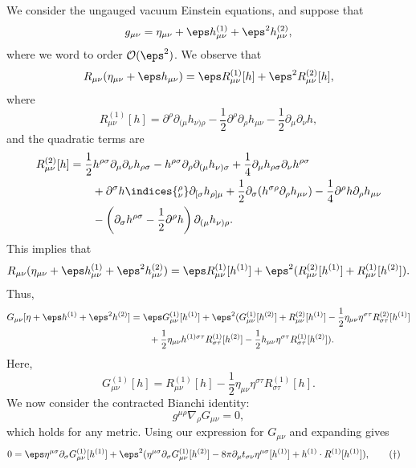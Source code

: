 \documentclass[12pt]{article}
\begin{document}
We consider the ungauged vacuum Einstein equations, and suppose that
\[
g_{\mu\nu} = \eta_{\mu\nu} + \eps h_{\mu\nu}^{(1)} + \eps^2 h_{\mu\nu}^{(2)},
\]
where we word to order $\mathcal{O}(\eps^2)$. We observe that
\[
	R_{\mu\nu}(\eta_{\mu\nu} + \eps h_{\mu\nu}) = \eps R_{\mu\nu}^{(1)}[h] + \eps^2 R_{\mu\nu}^{(2)}[h],
\]
where
\[
	R_{\mu\nu}^{(1)}[h] = \partial^\rho \partial_{(\mu} h_{\nu) \rho} - \frac 12 \partial^\rho \partial_\rho h_{\mu\nu} - \frac 12 \partial_\mu \partial_\nu h,
\]
and the quadratic terms are
\begin{align*}
	R_{\mu\nu}^{(2)}[h] &= \frac 12 h^{\rho\sigma}\partial_\mu \partial_\nu h_{\rho\sigma} - h^{\rho\sigma} \partial_\rho \partial_{(\mu} h_{\nu) \sigma} + \frac 14 \partial_\mu h_{\rho\sigma} \partial_\nu h^{\rho\sigma} \\
			    &\qquad + \partial^\sigma h\indices{^{\rho}_{\nu}} \partial_{[\sigma} h_{\rho]\mu} + \frac 12 \partial_\sigma (h^{\sigma\rho} \partial_\rho h_{\mu\nu} ) - \frac 14 \partial^\rho h \partial_\rho h_{\mu\nu} \\
			    & \qquad - \left(\partial_\sigma h^{\rho\sigma} - \frac 12 \partial^\rho h\right) \partial_{(\mu} h_{\nu)\rho}.
\end{align*}
This implies that
\[
	R_{\mu\nu}(\eta_{\mu\nu} + \eps h_{\mu\nu}^{(1)} + \eps^2 h_{\mu\nu}^{(2)}) = \eps R_{\mu\nu}^{(1)} [h^{(1)}] + \eps^2 (R_{\mu\nu}^{(2)} [h^{(1)}] + R_{\mu\nu}^{(1)} [h^{(2)}] ).
\]
Thus,
\begin{align*}
	G_{\mu\nu}[\eta + \eps h^{(1)} + \eps^2 h^{(2)}] &= \eps G_{\mu\nu}^{(1)} [h^{(1)}] + \eps^2 (G_{\mu\nu}^{(1)}[h^{(2)}] + R_{\mu\nu}^{(2)}[h^{(1)}] - \frac 12 \eta_{\mu\nu} \eta^{\sigma\tau} R_{\sigma\tau}^{(2)}[h^{(1)}]  \\
							 & \qquad + \frac 12 \eta_{\mu\nu} h^{(1) \sigma \tau} R^{(1)}_{\sigma\tau} [h^{(2)}] - \frac 12 h_{\mu\nu} \eta^{\sigma\tau} R_{\sigma\tau}^{(1)} [h^{(2)}]).
\end{align*}
Here,
\[
	G_{\mu\nu}^{(1)}[h] = R_{\mu\nu}^{(1)}[h] - \frac 12 \eta_{\mu\nu} \eta^{\sigma\tau} R_{\sigma\tau}^{(1)}[h].
\]
We now consider the contracted Bianchi identity:
\[
g^{\mu\rho} \nabla_\rho G_{\mu\nu} = 0,
\]
which holds for any metric. Using our expression for $G_{\mu\nu}$ and expanding gives
\begin{align*}
	0 &= \eps \eta^{\mu\sigma} \partial_\sigma G_{\mu\nu}^{(1)} [h^{(1)}] + \eps^2 (\eta^{\mu\sigma} \partial_\sigma G_{\mu\nu}^{(1)}[h^{(2)}] - 8 \pi \partial_\mu t_{\sigma\nu} \eta^{\mu\sigma}[h^{(1)}] + h^{(1)} \cdot R^{(1)}[h^{(1)}]), \tag{$\dagger$}
\end{align*}
\end{document}
